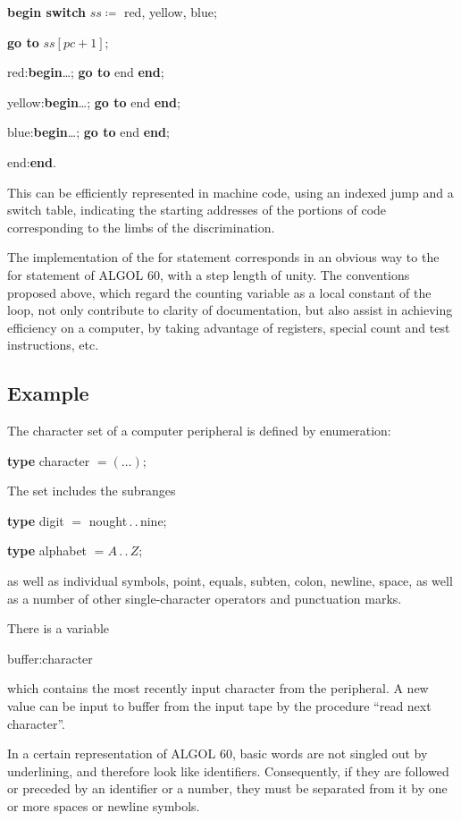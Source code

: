 \quad \textbf{begin switch} $ss \coloneq$ red, yellow, blue;

\quad \quad \textbf{go to} $ss[pc + 1]$;

\quad \quad red:\textbf{begin}\dots; \textbf{go to} end \textbf{end};

\quad \quad yellow:\textbf{begin}\dots; \textbf{go to} end \textbf{end};

\quad \quad blue:\textbf{begin}\dots; \textbf{go to} end \textbf{end};

\quad end:\textbf{end}. 

This can be efficiently represented in machine code, using an indexed jump and a switch table, indicating the starting addresses of the portions of code corresponding to the limbs of the discrimination.

The implementation of the for statement corresponds in an obvious way to the for statement of ALGOL 60, with a step length of unity. The conventions proposed above, which regard the counting variable as a local constant of the loop, not only contribute to clarity of documentation, but also assist in achieving efficiency on a computer, by taking advantage of registers, special count and test instructions, etc.

\subsection{Example}
\label{sec:example-3-3}

The character set of a computer peripheral is defined by enumeration:

\quad \textbf{type} character $= (\dots)$;

\noindent
The set includes the subranges

\quad \textbf{type} digit $=$ nought\,.\,.\,nine;

\quad \textbf{type} alphabet $= A\,.\,.\,Z$;

\noindent
as well as individual symbols, point, equals, subten, colon, newline, space, as well as a number of other single-character operators and punctuation marks.

There is a variable

\quad buffer:character 

\noindent
which contains the most recently input character from the peripheral. A new value can be input to buffer from the input tape by the procedure ``read next character''.

In a certain representation of ALGOL 60, basic words are not singled out by underlining, and therefore look like identifiers. Consequently, if they are followed or preceded by an identifier or a number, they must be separated from it by one or more spaces or newline symbols.

